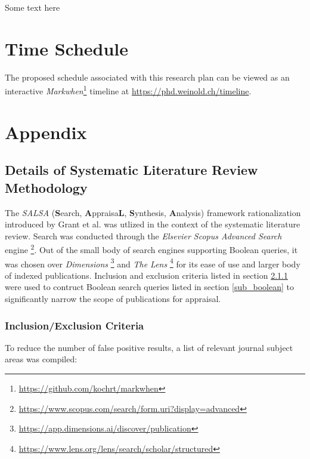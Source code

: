 \documentclass{article}
\begin{document}
    Some text here
    
\section{Time Schedule}

    The proposed schedule associated with this research plan can be viewed as an interactive \textit{Markwhen}\footnote{\url{https://github.com/kochrt/markwhen}} timeline at \url{https://phd.weinold.ch/timeline}.

\newpage
\section{Appendix}


    \subsection{Details of Systematic Literature Review Methodology}
    
        The \textit{SALSA} (\textbf{S}earch, \textbf{A}ppraisa\textbf{L}, \textbf{S}ynthesis, \textbf{A}nalysis) framework rationalization introduced by Grant et al. \cite{grant_typology_2009} was utlized in the context of the systematic literature review. Search was conducted through the \textit{Elsevier Scopus Advanced Search} engine \footnote{\url{https://www.scopus.com/search/form.uri?display=advanced}}. Out of the small body of search engines supporting Boolean queries, it was chosen over \textit{Dimensions} \footnote{\url{https://app.dimensions.ai/discover/publication}} and \textit{The Lens} \footnote{\url{https://www.lens.org/lens/search/scholar/structured}} for its ease of use and larger body of indexed publications. Inclusion and exclusion criteria listed in section \ref{subsub_inclusion_exclusion} were used to contruct Boolean search queries listed in section \ref{sub_boolean} to significantly narrow the scope of publications for appraisal. 
        
        \subsubsection{Inclusion/Exclusion Criteria}
        \label{subsub_inclusion_exclusion}
        
            To reduce the number of false positive results, a list of relevant journal subject areas was compiled:
            
\end{document}
